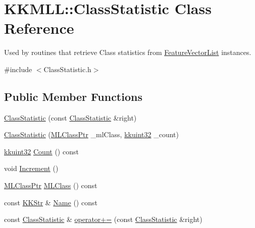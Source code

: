 \hypertarget{class_k_k_m_l_l_1_1_class_statistic}{}\section{K\+K\+M\+LL\+:\+:Class\+Statistic Class Reference}
\label{class_k_k_m_l_l_1_1_class_statistic}


Used by routines that retrieve Class statistics from \hyperlink{class_k_k_m_l_l_1_1_feature_vector_list}{Feature\+Vector\+List} instances.  




{\ttfamily \#include $<$Class\+Statistic.\+h$>$}

\subsection*{Public Member Functions}
\begin{DoxyCompactItemize}
\item 
\hyperlink{class_k_k_m_l_l_1_1_class_statistic_a3d31ff31d4b3f4530b246d62e2020ab4}{Class\+Statistic} (const \hyperlink{class_k_k_m_l_l_1_1_class_statistic}{Class\+Statistic} \&right)
\item 
\hyperlink{class_k_k_m_l_l_1_1_class_statistic_ae83a0c6a86653dfdaeec74e2213a205f}{Class\+Statistic} (\hyperlink{namespace_k_k_m_l_l_ac272393853d59e72e8456f14cd6d8c23}{M\+L\+Class\+Ptr} \+\_\+ml\+Class, \hyperlink{namespace_k_k_b_af8d832f05c54994a1cce25bd5743e19a}{kkuint32} \+\_\+count)
\item 
\hyperlink{namespace_k_k_b_af8d832f05c54994a1cce25bd5743e19a}{kkuint32} \hyperlink{class_k_k_m_l_l_1_1_class_statistic_ace228f15b538c012781b4f6800c837c5}{Count} () const 
\item 
void \hyperlink{class_k_k_m_l_l_1_1_class_statistic_aee13f1470120fef8fb91737e2a83ad6a}{Increment} ()
\item 
\hyperlink{namespace_k_k_m_l_l_ac272393853d59e72e8456f14cd6d8c23}{M\+L\+Class\+Ptr} \hyperlink{class_k_k_m_l_l_1_1_class_statistic_a7f2775bca7634dd376ffe3c804e65c3e}{M\+L\+Class} () const 
\item 
const \hyperlink{class_k_k_b_1_1_k_k_str}{K\+K\+Str} \& \hyperlink{class_k_k_m_l_l_1_1_class_statistic_a7cf87217e07220c5269dbd9f6299bb43}{Name} () const 
\item 
const \hyperlink{class_k_k_m_l_l_1_1_class_statistic}{Class\+Statistic} \& \hyperlink{class_k_k_m_l_l_1_1_class_statistic_ab278219c6679a6a5d7a815b92c26a029}{operator+=} (const \hyperlink{class_k_k_m_l_l_1_1_class_statistic}{Class\+Statistic} \&right)
\end{DoxyCompactItemize}


